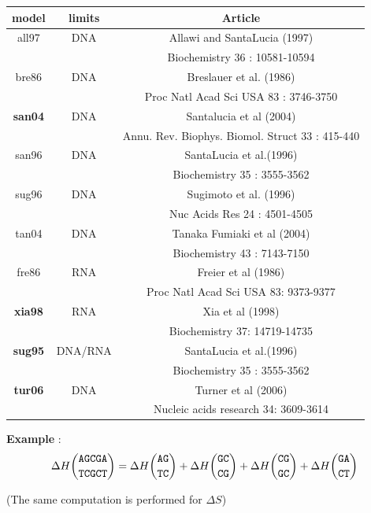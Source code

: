 \documentclass{article}
\begin{document}
\begin{table}[hc]
\begin{tabular}[h]{| c | c | c |}
\textbf{model} & \textbf{limits} & \textbf{Article} \\ 
\hline
all97 & DNA & Allawi and SantaLucia (1997) \\
 & & Biochemistry 36 : 10581-10594 \\
 \hline
bre86 & DNA & Breslauer et al. (1986) \\
 & & Proc Natl Acad Sci USA 83 : 3746-3750 \\
 \hline
\textbf{san04} & DNA & Santalucia et al (2004) \\
 & & Annu. Rev. Biophys. Biomol. Struct 33 : 415-440 \\
 \hline
san96 & DNA & SantaLucia et al.(1996) \\
 & & Biochemistry 35 : 3555-3562 \\
 \hline
sug96 & DNA & Sugimoto et al. (1996)\\
 & & Nuc Acids Res 24 : 4501-4505 \\
 \hline
tan04 & DNA & Tanaka Fumiaki et al (2004)\\
 & & Biochemistry 43 : 7143-7150  \\
 \hline
fre86 & RNA & Freier et al (1986) \\
 & & Proc Natl Acad Sci USA 83: 9373-9377 \\
 \hline
\textbf{xia98} & RNA & Xia et al (1998) \\
 & & Biochemistry 37: 14719-14735 \\
 \hline
\textbf{sug95} & DNA/RNA & SantaLucia et al.(1996) \\
 & & Biochemistry 35 : 3555-3562 \\
 \hline
\textbf{tur06} & DNA & Turner et al (2006) \\
 & & Nucleic acids research 34: 3609-3614 \\
 \hline
\end{tabular}
\end{table}


\textbf{Example} :
\begin{multline*}
\Delta H {\mbox{\texttt{AGCGA}} \choose \mbox{\texttt{TCGCT}}} = 
\Delta H {\mbox{\texttt{AG}} \choose \mbox{\texttt{TC}} } + 
\Delta H {\mbox{\texttt{GC}} \choose \mbox{\texttt{CG}} } +
\Delta H {\mbox{\texttt{CG}} \choose \mbox{\texttt{GC}} } +
\Delta H {\mbox{\texttt{GA}} \choose \mbox{\texttt{CT}} }
\end{multline*}

       (The same computation is performed for $\Delta S$)
       
\end{document}
